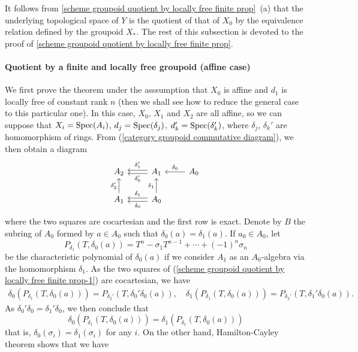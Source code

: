 It follows from \cref{scheme groupoid quotient by locally free finite prop}~(a) that the underlying topological space of $Y$ is the quotient of that of $X_0$ by the equivalence relation defined by the groupoid $X_*$. The rest of this subsection is devoted to the proof of \cref{scheme groupoid quotient by locally free finite prop}.

\paragraph{Quotient by a finite and locally free groupoid (affine case)}\label{scheme groupoid quotient by locally free finite affine case paragraph}
We first prove the theorem under the asssumption that $X_0$ is affine and $d_1$ is locally free of constant rank $n$ (then we shall see how to reduce the general case to this particular one). In this case, $X_0$, $X_1$ and $X_2$ are all affine, so we can suppose that $X_i=\mathrm{Spec}(A_i)$, $d_j=\mathrm{Spec}(\delta_j)$, $d_k'=\mathrm{Spec}(\delta_k')$, where $\delta_j$, $\delta_k'$ are homomorphism of rings. From (\ref{category groupoid commutative diagram}), we then obtain a diagram
\begin{equation}\label{scheme groupoid quotient by locally free finite prop-1}
\begin{tikzcd}
A_2&A_1\ar[l,shift left=2pt,"\delta_0'"]\ar[l,shift right=2pt,swap,"\delta_1'"]&A_0\ar[l,swap,"\delta_0"]\\
A_1\ar[u,"\delta_2'"]&A_0\ar[l,shift left=2pt,"\delta_0"]\ar[l,shift right=2pt,swap,"\delta_1"]\ar[u,"\delta_1"]
\end{tikzcd}
\end{equation}
where the two squares are cocartesian and the first row is exact. Denote by $B$ the subring of $A_0$ formed by $a\in A_0$ such that $\delta_0(a)=\delta_1(a)$. If $a_0\in A_0$, let
\[P_{\delta_1}(T,\delta_0(a))=T^n-\sigma_1T^{n-1}+\cdots+(-1)^n\sigma_n\]
be the characteristic polynomial of $\delta_0(a)$ if we consider $A_1$ as an $A_0$-algebra via the homomorphism $\delta_1$. As the two squares of (\ref{scheme groupoid quotient by locally free finite prop-1}) are cocartesian, we have
\begin{align*}
\delta_0(P_{\delta_1}(T,\delta_0(a)))=P_{\delta_2'}(T,\delta_0'\delta_0(a)),\quad \delta_1(P_{\delta_1}(T,\delta_0(a)))=P_{\delta_2'}(T,\delta_1'\delta_0(a)).
\end{align*}
As $\delta_0'\delta_0=\delta_1'\delta_0$, we then conclude that
\[\delta_0(P_{\delta_1}(T,\delta_0(a)))=\delta_1(P_{\delta_1}(T,\delta_0(a)))\]
that is, $\delta_0(\sigma_i)=\delta_1(\sigma_i)$ for any $i$. On the other hand, Hamilton-Cayley theorem shows that we have
